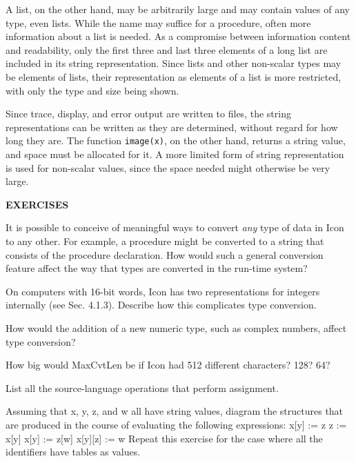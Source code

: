 A list, on the other hand, may be arbitrarily large and may contain
values of any type, even lists. While the name may suffice for a
procedure, often more information about a list is needed. As a
compromise between information content and readability, only the first
three and last three elements of a long list are included in its
string representation.  Since lists and other non-scalar types may be
elements of lists, their representation as elements of a list is more
restricted, with only the type and size being shown.

Since trace, display, and error output are written to files, the
string representations can be written as they are determined, without
regard for how long they are. The function \texttt{image(x)}, on the
other hand, returns a string value, and space must be allocated for
it. A more limited form of string representation is used for
non-scalar values, since the space needed might otherwise be very
large.

\bigskip

\noindent\textbf{EXERCISES}

 It is possible to conceive of meaningful ways to convert
\textit{any} type of data in Icon to any other. For example, a
procedure might be converted to a string that consists of the
procedure declaration. How would such a general conversion feature
affect the way that types are converted in the run-time system?

 On computers with 16-bit words, Icon has two
representations for integers internally (see Sec. 4.1.3). Describe how
this complicates type conversion.

 How would the addition of a new numeric type,
such as complex numbers, affect type conversion?

 How big would MaxCvtLen be if Icon had 512
different characters?  128? 64?

 List all the source-language operations that
perform assignment.

 Assuming that x, y, z, and w all have string values, diagram the
structures that are produced in the course of evaluating the following
expressions:\newline
x[y] := z\newline
z := x[y]\newline
x[y] := z[w]\newline
x[y][z] := w\newline
Repeat this exercise for the case where all the identifiers have tables as values.

